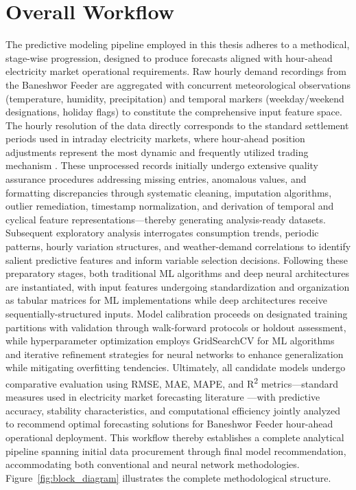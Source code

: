 \documentclass[oneside, 12pt]{book}
\numberwithin{equation}{chapter}
\newcommand{\sizexii}{\fontsize{12pt}{6pt}\selectfont}
\begin{document}
\section{\sizexii Overall Workflow}

The predictive modeling pipeline employed in this thesis adheres to a methodical, stage-wise progression, designed to produce forecasts aligned with hour-ahead electricity market operational requirements. Raw hourly demand recordings from the Baneshwor Feeder are aggregated with concurrent meteorological observations (temperature, humidity, precipitation) and temporal markers (weekday/weekend designations, holiday flags) to constitute the comprehensive input feature space. The hourly resolution of the data directly corresponds to the standard settlement periods used in intraday electricity markets, where hour-ahead position adjustments represent the most dynamic and frequently utilized trading mechanism \parencite{weron2014electricity}. These unprocessed records initially undergo extensive quality assurance procedures addressing missing entries, anomalous values, and formatting discrepancies through systematic cleaning, imputation algorithms, outlier remediation, timestamp normalization, and derivation of temporal and cyclical feature representations---thereby generating analysis-ready datasets. Subsequent exploratory analysis interrogates consumption trends, periodic patterns, hourly variation structures, and weather-demand correlations to identify salient predictive features and inform variable selection decisions. Following these preparatory stages, both traditional ML algorithms and deep neural architectures are instantiated, with input features undergoing standardization and organization as tabular matrices for ML implementations while deep architectures receive sequentially-structured inputs. Model calibration proceeds on designated training partitions with validation through walk-forward protocols or holdout assessment, while hyperparameter optimization employs GridSearchCV for ML algorithms and iterative refinement strategies for neural networks to enhance generalization while mitigating overfitting tendencies. Ultimately, all candidate models undergo comparative evaluation using RMSE, MAE, MAPE, and R\textsuperscript{2} metrics---standard measures used in electricity market forecasting literature \parencite{hong2016energy}---with predictive accuracy, stability characteristics, and computational efficiency jointly analyzed to recommend optimal forecasting solutions for Baneshwor Feeder hour-ahead operational deployment. This workflow thereby establishes a complete analytical pipeline spanning initial data procurement through final model recommendation, accommodating both conventional and neural network methodologies. Figure~\ref{fig:block_diagram} illustrates the complete methodological structure.
\end{document}
